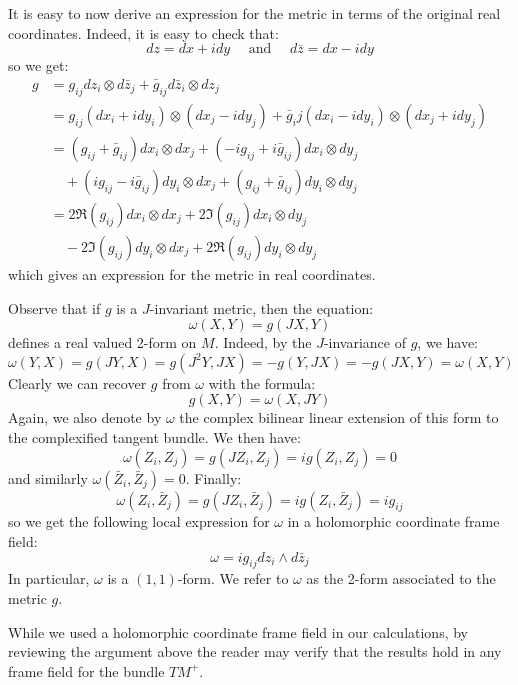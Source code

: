 \begin{remark}  It is easy to now derive an expression for the metric in terms of the original real coordinates.  Indeed, it is easy to check that:
%
$$ d z = dx + i dy \quad \text{ and } \quad d \bar{z} = dx - i dy $$
%
so we get:
%
\begin{align*}
g &= g_{ij} dz_i \otimes d \bar{z}_j + \bar{g}_{ij} d \bar{z}_i \otimes d z_j \\
&= g_{ij} ( dx_i + i dy_i ) \otimes ( d x_j - i d y_j ) + \bar{g}_ij (  d x_i - i d y_i  ) \otimes ( dx_j + i dy_j ) \\
%
&= ( g_{ij} + \bar{g}_{ij} ) dx_i \otimes dx_j + ( - i g_{ij} + i \bar{g}_{ij} ) dx_i \otimes dy_j \\
& \quad + ( i g_{ij} - i \bar{g}_{ij} ) dy_i \otimes dx_j + ( g_{ij} + \bar{g}_{ij} ) dy_i \otimes dy_j \\
%
&= 2 \Re (g_{ij}) dx_i \otimes dx_j + 2 \Im( g_{ij} ) dx_i \otimes dy_j \\
& \quad - 2 \Im( g_{ij} ) dy_i \otimes dx_j + 2 \Re ( g_{ij} ) dy_i \otimes dy_j
\end{align*}
%
which gives an expression for the metric in real coordinates.
\end{remark}

Observe that if $g$ is a $J$-invariant metric, then the equation:
%
$$\omega(X,Y) = g(JX, Y)$$
%
defines a real valued 2-form on $M$. Indeed, by the $J$-invariance of $g$, we have:
%
$$ \omega(Y,X) = g(JY, X) = g( J^2 Y, JX ) = - g( Y, JX ) = - g( JX, Y ) = \omega( X, Y ) $$
%
Clearly we can recover $g$ from $\omega$ with the formula:
%
$$ g(X,Y) = \omega(X,JY) $$
%
Again, we also denote by $\omega$ the complex bilinear linear extension of this form to the complexified tangent bundle.  We then have:
%
$$ \omega( Z_i, Z_j ) = g( J Z_i, Z_j ) = i g( Z_i, Z_j ) = 0 $$
%
and similarly $ \omega( \bar{Z}_i, \bar{Z}_j ) = 0 $.  Finally:
%
$$ \omega( Z_i, \bar{Z}_j ) = g( J Z_i, \bar{Z}_j ) = i g( Z_i, \bar{Z}_j ) = i g_{ij} $$
%
so we get the following local expression for $\omega$ in a holomorphic coordinate frame field:
%
$$ \omega = i g_{ij} d z_i \wedge d \bar{z}_j $$
%
In particular, $\omega$ is a $(1,1)$-form. We refer to $\omega$ as the 2-form associated to the metric $g$.

\begin{remark}
While we used a holomorphic coordinate frame field in our calculations, by reviewing the argument above the reader may verify that the results hold in any frame field for the bundle $TM^{+}$.
\end{remark}

